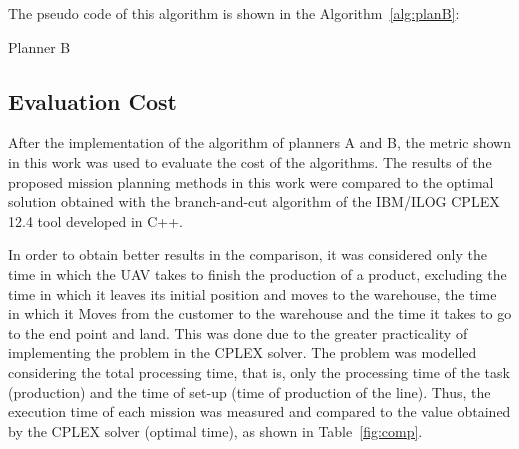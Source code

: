 \documentclass[conference,harvard,brazil,english]{sbatex}
\begin{document}
The pseudo code of this algorithm is shown in the Algorithm~\ref{alg:planB}:

\begin{algorithm}[H]
\captionsetup{list=no}
\caption{Planner B}\label{alg:planB}
\end{algorithm}

\subsection{Evaluation Cost}
\label{sec:acusto}

After the implementation of the algorithm of planners A and B, the metric shown in this work was used to evaluate the cost of the algorithms. The results of the proposed mission planning methods in this work were compared to the optimal solution obtained with the branch-and-cut algorithm of the IBM/ILOG CPLEX 12.4 tool developed in C++.

In order to obtain better results in the comparison, it was considered only the time in which the UAV takes to finish the production of a product, excluding the time in which it leaves its initial position and moves to the warehouse, the time in which it Moves from the customer to the warehouse and the time it takes to go to the end point and land. This was done due to the greater practicality of implementing the problem in the CPLEX solver. The problem was modelled considering the total processing time, that is, only the processing time of the task (production) and the time of set-up (time of production of the line). Thus, the execution time of each mission was measured and compared to the value obtained by the CPLEX solver (optimal time), as shown in Table~\ref{fig:comp}.
\end{document}

